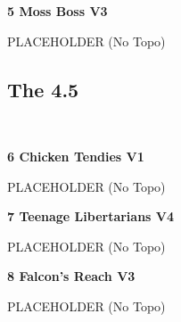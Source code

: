 \begin{multicols}{2}
\begin{minipage}{\columnwidth}
			\end{minipage}
			
					\begin{minipage}{\linewidth}	
					\label{rt:Moss Boss}
\colorbox{green!20}{
\parbox{0.95\textwidth}{
\textbf{
5 Moss Boss V3   
}
}
}

					\begin{adjustwidth}{0.5cm}{}				
					PLACEHOLDER
						\newline (No Topo) 
					\end{adjustwidth}
					\end{minipage}
			\begin{minipage}{\columnwidth}
			\subsection*{The 4.5}\label{bf:The 4.5}
			\
			
			\end{minipage}
			
					\begin{minipage}{\linewidth}	
					\label{rt:Chicken Tendies}
\colorbox{green!20}{
\parbox{0.95\textwidth}{
\textbf{
6 Chicken Tendies V1   
}
}
}

					\begin{adjustwidth}{0.5cm}{}				
					PLACEHOLDER
						\newline (No Topo) 
					\end{adjustwidth}
					\end{minipage}
					\begin{minipage}{\linewidth}	
					\label{rt:Teenage Libertarians}
\colorbox{RoyalBlue!20}{
\parbox{0.95\textwidth}{
\textbf{
7 Teenage Libertarians V4     
}
}
}

					\begin{adjustwidth}{0.5cm}{}				
					PLACEHOLDER
						\newline (No Topo) 
					\end{adjustwidth}
					\end{minipage}
					\begin{minipage}{\linewidth}	
					\label{rt:Falcon's Reach}
\colorbox{green!20}{
\parbox{0.95\textwidth}{
\textbf{
8 Falcon's Reach V3   
}
}
}

					\begin{adjustwidth}{0.5cm}{}				
					PLACEHOLDER
						\newline (No Topo) 
					\end{adjustwidth}
					\end{minipage}
\newpage

\end{multicols}

